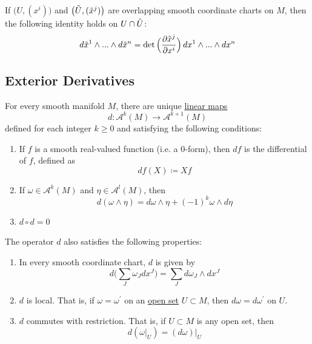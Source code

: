 \documentclass{article}
\newcounter{theorem}[section]
\begin{document}
    \begin{corollary}
      \label{thm:change-of-coordinates-for-a-top-degree-form}
    If $\big(U, (x^i)\big)$ and $\big(\Tilde{U}, (\Tilde{x}^j)\big)$ are overlapping smooth coordinate charts on $M$, then the following identity holds on $U \cap \Tilde{U}$:
    \begin{equation}
      d\Tilde{x}^1 \wedge ... \wedge d\Tilde{x}^n = \det \Big( \frac{\partial \Tilde{x}^j}{\partial x^i}\Big)\, dx^1 \wedge ... \wedge dx^n
    \end{equation}
    \end{corollary}

  \subsection{Exterior Derivatives}

    \begin{theorem}
      \label{thm:the-exterior-derivative}
    For every smooth manifold $M$, there are unique \hyperref[lin-def:linear_map]{linear maps}
    \begin{equation}
      d: \mathcal{A}^k (M) \to \mathcal{A}^{k+1} (M)
    \end{equation}
    defined for each integer $k \geq 0$ and satisfying the following conditions: 
    \begin{enumerate}
        \item If $f$ is a smooth real-valued function (i.e. a $0$-form), then $df$ is the differential of $f$, defined as 
        \begin{equation}
          df(X) \coloneqq X f
        \end{equation}
        \item If $\omega \in \mathcal{A}^k (M)$ and $\eta \in \mathcal{A}^l (M)$, then 
        \begin{equation}
          d (\omega \wedge \eta) = d \omega \wedge \eta + (-1)^k \omega \wedge d\eta
        \end{equation}
        \item $d \circ d = 0$
    \end{enumerate}
    The operator $d$ also satisfies the following properties: 
    \begin{enumerate}
        \item In every smooth coordinate chart, $d$ is given by 
        \begin{equation}
          d \bigg( \sum_J \omega_J dx^J \bigg) = \sum_J d\omega_J \wedge d x^J
        \end{equation}
        \item $d$ is local. That is, if $\omega = \omega^\prime$ on an \hyperref[pst-def:open-set]{open set} $U \subset M$, then $d\omega = d\omega^\prime$ on $U$. 
        \item $d$ commutes with restriction. That is, if $U \subset M$ is any open set, then 
        \begin{equation}
          d (\omega|_U) = (d \omega) \big|_U
        \end{equation}
    \end{enumerate}
    \end{theorem}
\end{document}
